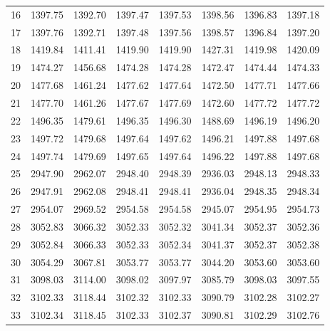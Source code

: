 \documentclass[10pt,oneside]{article}
\begin{document}
\begin{table}[h!]
\begin{tabular}{cccccccc}
16 &   1397.75 & 1392.70 & 1397.47 & 1397.53 &      1398.56 & 1396.83 & 1397.18 \\
17 &   1397.76 & 1392.71 & 1397.48 & 1397.56 &      1398.57 & 1396.84 & 1397.20 \\
18 &   1419.84 & 1411.41 & 1419.90 & 1419.90 &      1427.31 & 1419.98 & 1420.09 \\
19 &   1474.27 & 1456.68 & 1474.28 & 1474.28 &      1472.47 & 1474.44 & 1474.33 \\
20 &   1477.68 & 1461.24 & 1477.62 & 1477.64 &      1472.50 & 1477.71 & 1477.66 \\
21 &   1477.70 & 1461.26 & 1477.67 & 1477.69 &      1472.60 & 1477.72 & 1477.72 \\
22 &   1496.35 & 1479.61 & 1496.35 & 1496.30 &      1488.69 & 1496.19 & 1496.20 \\
23 &   1497.72 & 1479.68 & 1497.64 & 1497.62 &      1496.21 & 1497.88 & 1497.68 \\
24 &   1497.74 & 1479.69 & 1497.65 & 1497.64 &      1496.22 & 1497.88 & 1497.68 \\
25 &   2947.90 & 2962.07 & 2948.40 & 2948.39 &      2936.03 & 2948.13 & 2948.33 \\
26 &   2947.91 & 2962.08 & 2948.41 & 2948.41 &      2936.04 & 2948.35 & 2948.34 \\
27 &   2954.07 & 2969.52 & 2954.58 & 2954.58 &      2945.07 & 2954.95 & 2954.73 \\
28 &   3052.83 & 3066.32 & 3052.33 & 3052.32 &      3041.34 & 3052.37 & 3052.36 \\
29 &   3052.84 & 3066.33 & 3052.33 & 3052.34 &      3041.37 & 3052.37 & 3052.38 \\
30 &   3054.29 & 3067.81 & 3053.77 & 3053.77 &      3044.20 & 3053.60 & 3053.60 \\
31 &   3098.03 & 3114.00 & 3098.02 & 3097.97 &      3085.79 & 3098.03 & 3097.55 \\
32 &   3102.33 & 3118.44 & 3102.32 & 3102.33 &      3090.79 & 3102.28 & 3102.27 \\
33 &   3102.34 & 3118.45 & 3102.33 & 3102.37 &      3090.81 & 3102.29 & 3102.76 \\
\bottomrule
\end{tabular}
\end{table}

\clearpage
\end{document}
